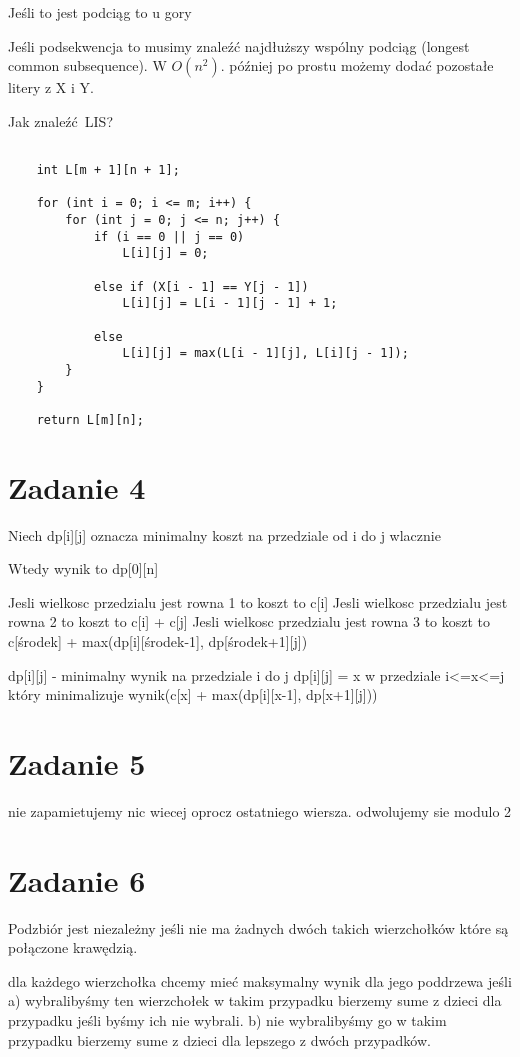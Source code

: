 \documentclass[12pt]{article}
\begin{document}
Jeśli to jest podciąg to u gory

Jeśli podsekwencja to musimy znaleźć najdłuższy wspólny podciąg (longest common subsequence). W $O(n^2)$. później po prostu możemy dodać pozostałe litery z X i Y.

Jak znaleźć LIS? 
\begin{lstlisting}
        
	int L[m + 1][n + 1]; 
  
    for (int i = 0; i <= m; i++) { 
        for (int j = 0; j <= n; j++) { 
            if (i == 0 || j == 0) 
                L[i][j] = 0; 
  
            else if (X[i - 1] == Y[j - 1]) 
                L[i][j] = L[i - 1][j - 1] + 1; 
  
            else
                L[i][j] = max(L[i - 1][j], L[i][j - 1]); 
        } 
    } 
  
    return L[m][n]; 
\end{lstlisting}

\section{Zadanie 4}

Niech dp[i][j] oznacza minimalny koszt na przedziale od i do j wlacznie

Wtedy wynik to dp[0][n]

Jesli wielkosc przedzialu jest rowna 1 to koszt to c[i]
Jesli wielkosc przedzialu jest rowna 2 to koszt to c[i] + c[j] 
Jesli wielkosc przedzialu jest rowna 3 to koszt to c[środek] + max(dp[i][środek-1], dp[środek+1][j])


dp[i][j] - minimalny wynik na przedziale i do j
dp[i][j] = x w przedziale i<=x<=j który minimalizuje wynik(c[x] + max(dp[i][x-1], dp[x+1][j]))





\section{Zadanie 5}
nie zapamietujemy nic wiecej oprocz ostatniego wiersza. odwolujemy sie modulo 2

\section{Zadanie 6}
Podzbiór jest niezależny jeśli nie ma żadnych dwóch takich wierzchołków które są połączone krawędzią. 

dla każdego wierzchołka chcemy mieć maksymalny wynik dla jego poddrzewa jeśli 
a) wybralibyśmy ten wierzchołek 
w takim przypadku bierzemy sume z dzieci dla przypadku jeśli byśmy ich nie wybrali. 
b) nie wybralibyśmy go
w takim przypadku bierzemy sume z dzieci dla lepszego z dwóch przypadków. 
\end{document}
